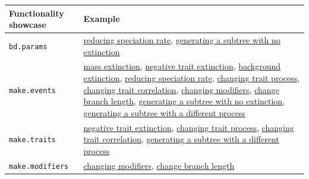 \documentclass[
]{book}
\begin{document}
\begin{longtable}[]{@{}ll@{}}
\toprule
\begin{minipage}[b]{0.57\columnwidth}\raggedright
Functionality showcase\strut
\end{minipage} & \begin{minipage}[b]{0.37\columnwidth}\raggedright
Example\strut
\end{minipage}\tabularnewline
\midrule
\endhead
\begin{minipage}[t]{0.57\columnwidth}\raggedright
\texttt{bd.params}\strut
\end{minipage} & \begin{minipage}[t]{0.37\columnwidth}\raggedright
\protect\hyperlink{EGred_spec}{reducing speciation rate}, \protect\hyperlink{EG_founding_purebirth}{generating a subtree with no extinction}\strut
\end{minipage}\tabularnewline
\begin{minipage}[t]{0.57\columnwidth}\raggedright
\texttt{make.events}\strut
\end{minipage} & \begin{minipage}[t]{0.37\columnwidth}\raggedright
\protect\hyperlink{EGrandom_ext}{mass extinction}, \protect\hyperlink{EGneg_ext}{negative trait extinction}, \protect\hyperlink{EGbg_ext}{background extinction}, \protect\hyperlink{EGred_spec}{reducing speciation rate}, \protect\hyperlink{EG_change_trait}{changing trait process}, \protect\hyperlink{EG_change_correlation}{changing trait correlation}, \protect\hyperlink{EG_change_modif}{changing modifiers}, \protect\hyperlink{EG_modify_brlen}{change branch length}, \protect\hyperlink{EG_founding_purebirth}{generating a subtree with no extinction}, \href{EG_founding_traits}{generating a subtree with a different process}\strut
\end{minipage}\tabularnewline
\begin{minipage}[t]{0.57\columnwidth}\raggedright
\texttt{make.traits}\strut
\end{minipage} & \begin{minipage}[t]{0.37\columnwidth}\raggedright
\protect\hyperlink{EGneg_ext}{negative trait extinction}, \protect\hyperlink{EG_change_trait}{changing trait process}, \protect\hyperlink{EG_change_correlation}{changing trait correlation}, \href{EG_founding_traits}{generating a subtree with a different process}\strut
\end{minipage}\tabularnewline
\begin{minipage}[t]{0.57\columnwidth}\raggedright
\texttt{make.modifiers}\strut
\end{minipage} & \begin{minipage}[t]{0.37\columnwidth}\raggedright
\protect\hyperlink{EG_change_modif}{changing modifiers}, \protect\hyperlink{EG_modify_brlen}{change branch length}\strut
\end{minipage}\tabularnewline
\bottomrule
\end{longtable}
\end{document}
